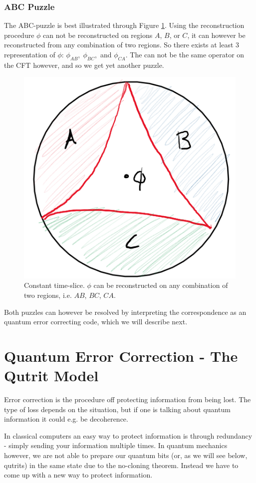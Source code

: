 \documentclass[letter,12pt]{article}
\begin{document}
\subsubsection*{ABC Puzzle}
The ABC-puzzle is best illustrated through Figure \ref{fig:adscftfig4}. Using the reconstruction procedure $\phi$ can not be reconstructed on regions $A$, $B$, or $C$, it can however be reconstructed from any combination of two regions. So there exists at least 3 representation of $\phi$: $\phi_{AB},\; \phi_{BC},$ and $\phi_{CA}$. The can not be the same operator on the CFT however, and so we get yet another puzzle. 
\begin{figure}[]
	\centering
	\includegraphics[width=0.3\linewidth]{ADS_CFT_Fig4}
	\caption{Constant time-slice. $\phi$ can be reconstructed on any
combination of two regions, i.e. $AB$, $BC$, $CA$.
}
	\label{fig:adscftfig4}
\end{figure}

Both puzzles can however be resolved by interpreting the correspondence as an quantum error correcting code, which we will describe next.

\section{Quantum Error Correction - The Qutrit Model}
Error correction is the procedure off protecting information from being lost. The type of loss depends on the situation, but if one is talking about quantum information it could e.g. be decoherence. 

In classical computers an easy way to protect information is through redundancy - simply sending your information multiple times. In quantum mechanics however, we are not able to prepare our quantum bits (or, as we will see below, qutrits) in the same state due to the no-cloning theorem. Instead we have to come up with a new way to protect information. 
\end{document}
